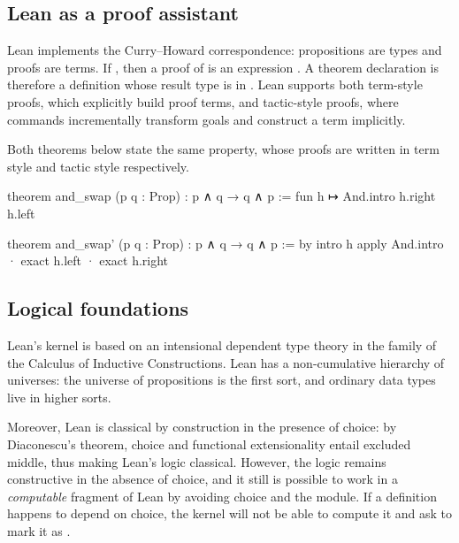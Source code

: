 \subsection{Lean as a proof assistant}
\label{subsec:lean-proof-assistant}

Lean implements the Curry--Howard correspondence: propositions are types and
proofs are terms.  If , then a proof of  is an expression
.  A theorem declaration is therefore a definition whose result type is
in .  Lean supports both term-style proofs, which explicitly build proof
terms, and tactic-style proofs, where commands incrementally transform goals and
construct a term implicitly.

\begin{example}
Both theorems below state the same property, whose proofs are written in term style and tactic style respectively.

\begin{leanlisting}
theorem and_swap (p q : Prop) : p ∧ q → q ∧ p :=
  fun h ↦ And.intro h.right h.left

theorem and_swap' (p q : Prop) : p ∧ q → q ∧ p := by
  intro h
  apply And.intro
  · exact h.left
  · exact h.right
\end{leanlisting}
\end{example}

\subsection{Logical foundations}
\label{subsec:lean-foundations}

Lean's kernel is based on an intensional dependent type theory in the family of
the Calculus of Inductive Constructions.
Lean has a non-cumulative hierarchy of universes:
the universe of propositions is the first sort, and ordinary data types live in higher sorts.

Moreover, Lean is classical by construction in the presence of choice:
by Diaconescu's theorem, choice and functional extensionality entail excluded middle, thus making Lean's
logic classical.
However, the logic remains constructive in the absence of choice, and it still is possible to work in a \emph{computable} fragment of Lean by avoiding choice and the  module.
If a definition happens to depend on choice, the kernel will not be able to compute it and ask to mark it as .